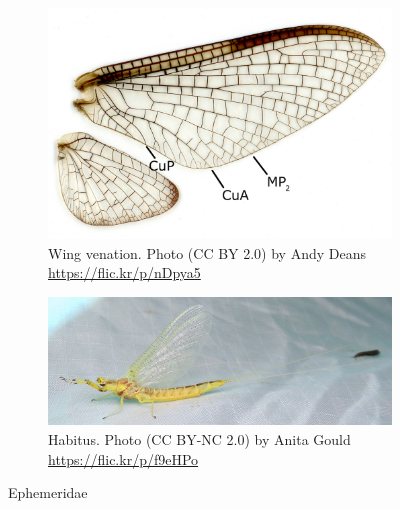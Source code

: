 \documentclass[letterpaper, 11pt]{article}
\begin{document}
\begin{figure}[ht!]
    \centering
    \begin{subfigure}[ht!]{0.35\textwidth}
        \includegraphics[width=\textwidth]{EphemeridWings}
        \caption{Wing venation. Photo (CC BY 2.0) by Andy Deans \url{https://flic.kr/p/nDpya5}}
        \label{fig:ephemwing}
    \end{subfigure}
    \hfill
    \begin{subfigure}[ht!]{0.60\textwidth}
        \includegraphics[width=\textwidth]{ephemeridbody}
        \caption{Habitus. Photo (CC BY-NC 2.0) by Anita Gould \url{https://flic.kr/p/f9eHPo}}
        \label{fig:ephemeridbody}
    \end{subfigure}
    \caption{Ephemeridae}\label{fig:ephemerid}
\end{figure}
\end{document}
